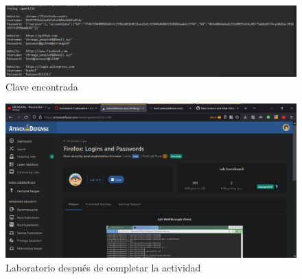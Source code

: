 \documentclass{article}
\begin{document}
        \clearpage
        \begin{figure}[!h]
            \centering
            \includegraphics[scale=0.4]{img/brute-found.png}
            \caption{Clave encontrada}
            \label{fig:brute-found}
        \end{figure}

        \begin{landscape}
            \begin{figure}[!h]
                \centering
                \includegraphics[scale=0.5]{img/firefox-evidence-after.png}
                \caption{Laboratorio después de completar la actividad}
                \label{fig:firefox-after}
            \end{figure}
        \end{landscape}
\end{document}
